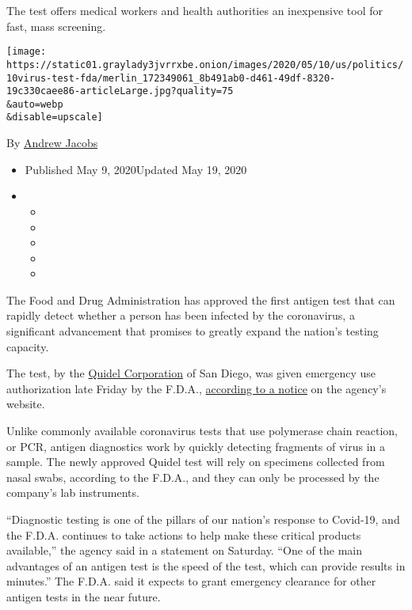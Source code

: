 The test offers medical workers and health authorities an inexpensive
tool for fast, mass screening.

\texttt{[image: https://static01.graylady3jvrrxbe.onion/images/2020/05/10/us/politics/10virus-test-fda/merlin\_172349061\_8b491ab0-d461-49df-8320-19c330caee86-articleLarge.jpg?quality=75\\\&auto=webp\\\&disable=upscale]}

By \href{https://www.nytimes3xbfgragh.onion/by/andrew-jacobs}{Andrew
Jacobs}

\begin{itemize}
\item
  Published May 9, 2020Updated May 19, 2020
\item
  \begin{itemize}
  \item
  \item
  \item
  \item
  \item
  \end{itemize}
\end{itemize}

The Food and Drug Administration has approved the first antigen test
that can rapidly detect whether a person has been infected by the
coronavirus, a significant advancement that promises to greatly expand
the nation's testing capacity.

The test, by the
\href{https://ir.quidel.com/news/news-release-details/2020/Quidel-Receives-Emergency-Authorization-for-Rapid-Antigen-COVID-19-Diagnostic-Assay/default.aspx}{Quidel
Corporation} of San Diego, was given emergency use authorization late
Friday by the F.D.A.,
\href{https://www.fda.gov/media/137886/download}{according to a notice}
on the agency's website.

Unlike commonly available coronavirus tests that use polymerase chain
reaction, or PCR, antigen diagnostics work by quickly detecting
fragments of virus in a sample. The newly approved Quidel test will rely
on specimens collected from nasal swabs, according to the F.D.A., and
they can only be processed by the company's lab instruments.

``Diagnostic testing is one of the pillars of our nation's response to
Covid-19, and the F.D.A. continues to take actions to help make these
critical products available,'' the agency said in a statement on
Saturday. ``One of the main advantages of an antigen test is the speed
of the test, which can provide results in minutes.'' The F.D.A. said it
expects to grant emergency clearance for other antigen tests in the near
future.

